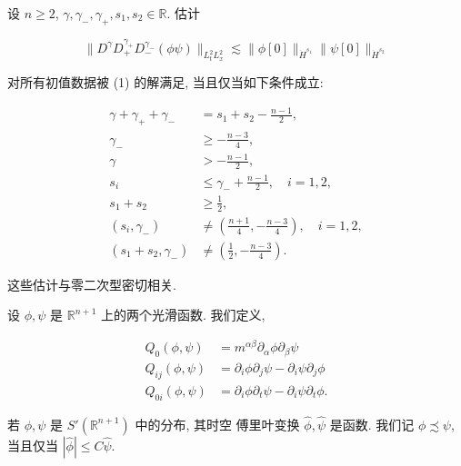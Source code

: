 \begin{proposition}[双线性估计{[}14{]}]\label{prop:cG-1.16}
设 $n \geq 2$, $\gamma,  \gamma_{-},  \gamma_{+},  s_1,  s_2 \in \mathbb{R}$. 估计

\[
\| D ^ {\gamma} D _ {+} ^ {\gamma_+} D _ {-} ^ {\gamma_-} (\phi \psi) \| _ {L _ {t} ^ {2} L _ {x} ^ {2}} \lesssim \| \phi [ 0 ] \| _ {\dot {H} ^ {s _ {1}}} \| \psi [ 0 ] \| _ {\dot {H} ^ {s _ {2}}}
\]

对所有初值数据被 (1) 的解满足, 当且仅当如下条件成立:

\[
\begin{aligned}
\gamma + \gamma_ {+} + \gamma_ {-} &= s _ {1} + s _ {2} - \frac {n - 1}{2},  \\
\gamma_ {-} &\geq - \frac {n - 3}{4},  \\
\gamma &> - \frac {n - 1}{2},  \\
s _ {i} &\leq \gamma_ {-} + \frac {n - 1}{2},  \quad i = 1,  2,  \\
s _ {1} + s _ {2} &\geq \frac {1}{2},  \\
(s _ {i},  \gamma_ {-}) &\neq \left(\frac {n + 1}{4},  - \frac {n - 3}{4}\right),  \quad i = 1,  2,  \\
(s _ {1} + s _ {2},  \gamma_ {-}) &\neq \left(\frac {1}{2},  - \frac {n - 3}{4}\right).
\end{aligned}
\]
\end{proposition}

这些估计与零二次型密切相关. 

\begin{definition}\label{def:cG-1.17}
设 $\phi,  \psi$ 是 $\mathbb{R}^{n+1}$ 上的两个光滑函数. 我们定义, 

\begin{align*}
Q _ {0} (\phi ,  \psi) &= m ^ {\alpha \beta} \partial_ {\alpha} \phi \partial_ {\beta} \psi \\
Q _ {i j} (\phi ,  \psi) &= \partial_ {i} \phi \partial_ {j} \psi - \partial_ {i} \psi \partial_ {j} \phi \\
Q _ {0 i} (\phi ,  \psi) &= \partial_ {i} \phi \partial_ {t} \psi - \partial_ {i} \psi \partial_ {t} \phi.
\end{align*}
\end{definition}

\begin{definition}\label{def:cG-1.18}
若 $\phi,  \psi$ 是 $S'(\mathbb{R}^{n+1})$ 中的分布, 其时空 傅里叶变换 $\widehat{\phi},  \widehat{\psi}$ 是函数. 我们记 $\phi \precsim \psi$, 当且仅当 $|\widehat{\phi}| \leq C\widehat{\psi}$. 
\end{definition}

